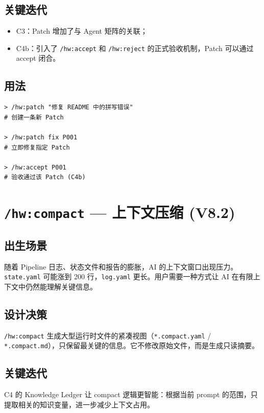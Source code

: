 \documentclass[
  outputdir=build,
  chapterstyle=cn,
  colorscheme=Simple,
  fontset=tech,
  code=false
]{Hypo-Note}
\begin{document}
\subsection{关键迭代}

\begin{itemize}[leftmargin=2em]
  \item C3：Patch 增加了与 Agent 矩阵的关联；
  \item C4b：引入了 \texttt{/hw:accept} 和 \texttt{/hw:reject} 的正式验收机制，Patch 可以通过 accept 闭合。
\end{itemize}

\subsection{用法}

\begin{lstlisting}[caption=创建和修复 Patch]
> /hw:patch "修复 README 中的拼写错误"
# 创建一条新 Patch

> /hw:patch fix P001
# 立即修复指定 Patch

> /hw:accept P001
# 验收通过该 Patch (C4b)
\end{lstlisting}

\section{\texttt{/hw:compact} — 上下文压缩 (V8.2)}

\subsection{出生场景}

随着 Pipeline 日志、状态文件和报告的膨胀，AI 的上下文窗口出现压力。\texttt{state.yaml} 可能涨到 200 行，\texttt{log.yaml} 更长。用户需要一种方式让 AI 在有限上下文中仍然能理解关键信息。

\subsection{设计决策}

\texttt{/hw:compact} 生成大型运行时文件的紧凑视图（\texttt{*.compact.yaml} / \texttt{*.compact.md}），只保留最关键的信息。它不修改原始文件，而是生成只读摘要。

\subsection{关键迭代}

C4 的 Knowledge Ledger 让 compact 逻辑更智能：根据当前 prompt 的范围，只提取相关的知识变量，进一步减少上下文占用。
\end{document}
